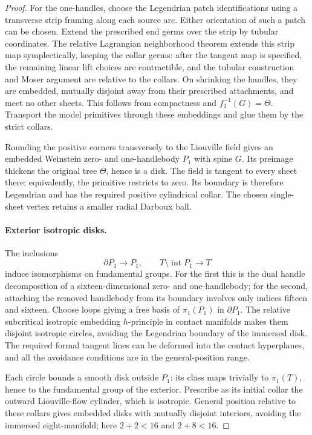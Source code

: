 \documentclass[11pt]{article}
\theoremstyle{definition}
\theoremstyle{remark}
\numberwithin{equation}{section}
\begin{document}
\begin{proof}
For the one-handles, choose the Legendrian patch identifications
using a transverse strip framing along each source arc.  Either
orientation of such a patch can be chosen.  Extend the prescribed
end germs over the strip by tubular coordinates.  The relative
Lagrangian neighborhood theorem extends this strip map
symplectically, keeping the collar germs: after the tangent map is
specified, the remaining linear lift choices are contractible,
and the tubular construction and Moser argument are relative to
the collars.  On shrinking the handles, they are embedded,
mutually disjoint away from their prescribed attachments, and
meet no other sheets.  This follows from compactness and
$f_1^{-1}(G)=\Theta$.  Transport the model primitives through
these embeddings and glue them by the strict collars.

Rounding the positive corners transversely to the Liouville field
gives an embedded Weinstein zero- and one-handlebody $P_1$ with
spine $G$.  Its preimage thickens the original tree $\Theta$,
hence is a disk.  The field is tangent to every sheet there;
equivalently, the primitive restricts to zero.  Its boundary is
therefore Legendrian and has the required positive cylindrical
collar.  The chosen single-sheet vertex retains a smaller radial
Darboux ball.

\paragraph{Exterior isotropic disks.}
The inclusions
\[
 \partial P_1\longrightarrow P_1,
 \qquad T\setminus\operatorname{int}P_1\longrightarrow T
\]
induce isomorphisms on fundamental groups.  For the first this is
the dual handle decomposition of a sixteen-dimensional zero-
and one-handlebody; for the second, attaching the removed
handlebody from its boundary involves only indices fifteen and
sixteen.  Choose loops giving a free basis of $\pi_1(P_1)$ in
$\partial P_1$.  The relative subcritical isotropic embedding
$h$-principle in contact manifolds
\cite[Theorem~12.4.1]{gromov-flexibility}
makes them disjoint isotropic circles, avoiding the Legendrian
boundary of the immersed disk.  The required formal tangent
lines can be deformed into the contact hyperplanes, and all the
avoidance conditions are in the general-position range.

Each circle bounds a smooth disk outside $P_1$: its class maps
trivially to $\pi_1(T)$, hence to the fundamental group of the
exterior.  Prescribe as its initial collar the outward
Liouville-flow cylinder, which is isotropic.  General position
relative to these collars gives embedded disks with mutually
disjoint interiors, avoiding the immersed eight-manifold; here
$2+2<16$ and $2+8<16$.


\end{proof}
\end{document}
